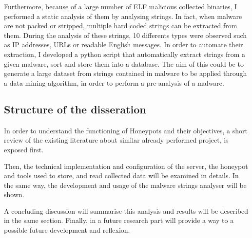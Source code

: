 Furthermore, because of a large number of ELF malicious collected binaries, I performed a static
analysis of them by analysing strings. In fact, when malware are not packed or stripped, multiple
 hard coded strings can be extracted from them. During the analysis of these strings, 10 differents
 types were observed such as IP addresses, URLs or readable English messages. In order to automate 
 their extraction, I developed a python script that automatically extract strings from a given
 malware, sort and store them into a database. The aim of this could be to generate 
 a large dataset from strings contained in malware to be applied through a data mining algorithm,
 in order to perform a pre-analysis of a malware.

\subsection{Structure of the disseration} %

\paragraph{}

In order to understand the functioning of Honeypots and their objectives, a short review of
the existing literature about similar already performed project, is exposed first.

Then, the technical implementation and configuration of the server, the honeypot and tools used to
store, and read collected data will be examined in details. In the same way, the development 
and usage of the malware strings analyser will be shown.

A concluding discussion will summarise this analysis and results will be described in the
same section. Finally, in a future research part will provide a way to a possible future development
and reflexion.
